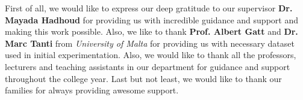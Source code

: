 First of all, we would like to express our deep gratitude to our supervisor \textbf{Dr. Mayada Hadhoud} for providing us with incredible guidance and support and making this work possible. Also, we like to thank \textbf{Prof. Albert Gatt} and \textbf{Dr. Marc Tanti} from \emph{University of Malta} for providing us with necessary dataset used in initial experimentation. Also, we would like to thank all the professors, lecturers and teaching assistants in our department for guidance and support throughout the college year. Last but not least, we would like to thank our families for always providing awesome support.